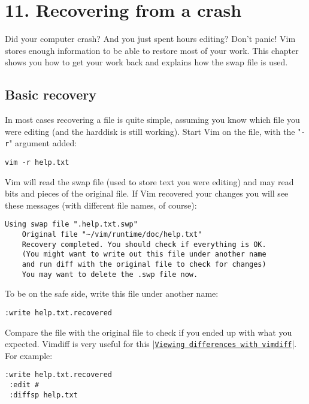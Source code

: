 \section{11. Recovering from a crash}
Did your computer crash?  And you just spent hours editing?  Don't panic!  Vim
stores enough information to be able to restore most of your work.  This
chapter shows you how to get your work back and explains how the swap file is
used.
\subsection{Basic recovery}
In most cases recovering a file is quite simple, assuming you know which file you were editing (and the harddisk is still working).
Start Vim on the file, with the "\verb!-r!" argument added:

\begin{Verbatim}[samepage=true]
 vim -r help.txt
\end{Verbatim}

Vim will read the swap file (used to store text you were editing) and may read bits and pieces of the original file.
If Vim recovered your changes you will see these messages (with different file names, of course):

\begin{Verbatim}[samepage=true]
    Using swap file ".help.txt.swp" 
    Original file "~/vim/runtime/doc/help.txt" 
    Recovery completed. You should check if everything is OK. 
    (You might want to write out this file under another name 
    and run diff with the original file to check for changes) 
    You may want to delete the .swp file now. 
\end{Verbatim}

To be on the safe side, write this file under another name:

\begin{Verbatim}[samepage=true]
 :write help.txt.recovered
\end{Verbatim}

Compare the file with the original file to check if you ended up with what you expected.
Vimdiff is very useful for this |\hyperref[Viewing differences with vimdiff]{\texttt{Viewing differences with vimdiff}}|.
For example:

\begin{Verbatim}[samepage=true]
 :write help.txt.recovered
 :edit #
 :diffsp help.txt
\end{Verbatim}

